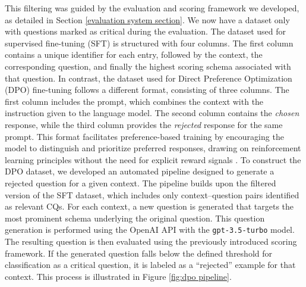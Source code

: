 \documentclass[11pt]{article}
\begin{document}
This filtering was guided by the evaluation and scoring framework we developed, as detailed in Section \ref{evaluation system section}. We now have a dataset only with questions marked as critical during the evaluation. The dataset used for supervised fine-tuning (SFT) is structured with four columns. The first column contains a unique identifier for each entry, followed by the context, the corresponding question, and finally the highest scoring schema associated with that question. In contrast, the dataset used for Direct Preference Optimization (DPO) fine-tuning follows a different format, consisting of three columns. The first column includes the prompt, which combines the context with the instruction given to the language model. The second column contains the \textit{chosen} response, while the third column provides the \textit{rejected} response for the same prompt. This format facilitates preference-based training by encouraging the model to distinguish and prioritize preferred responses, drawing on reinforcement learning principles without the need for explicit reward signals \citep{rafailov_direct_2024}. To construct the DPO dataset, we developed an automated pipeline designed to generate a rejected question for a given context. The pipeline builds upon the filtered version of the SFT dataset, which includes only context--question pairs identified as relevant CQs. For each context, a new question is generated that targets the most prominent schema underlying the original question. This question generation is performed using the OpenAI API with the \texttt{gpt-3.5-turbo} model. The resulting question is then evaluated using the previously introduced scoring framework. If the generated question falls below the defined threshold for classification as a critical question, it is labeled as a ``rejected'' example for that context. This process is illustrated in Figure \ref{fig:dpo pipeline}.
\end{document}
